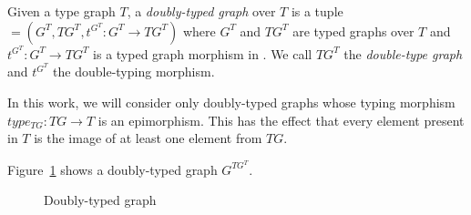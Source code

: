 \begin{definition} Given a type graph $T$, a \emph{doubly-typed graph} \doublyTypedGraph{} over $T$ is a tuple \doublyTypedGraph $= \left(G^T,TG^T, t^{G^T} : G^T \rightarrow TG^T\right)$ where $G^T$ and $TG^T$ are typed graphs over $T$ and \mbox{$t^{G^T} : G^T \rightarrow TG^T$} is a typed graph morphism in \typedGraphCategory{}. We call $TG^T$ the \emph{double-type graph} and $t^{G^T}$ the double-typing morphism.
\end{definition}

\begin{remark} In this work, we will consider only doubly-typed graphs whose typing morphism $type_{TG} : TG \rightarrow T$ is an epimorphism. This has the effect that every element present in $T$ is the image of at least one element from $TG$.
\end{remark}

\begin{example} Figure~\ref{fig:process:doubly-typed-graph} shows a doubly-typed graph $G^{TG^T}$.

\begin{figure}[!ht]
  \centering
  \caption{Doubly-typed graph}\label{fig:process:doubly-typed-graph}
\end{figure}

\end{example}

